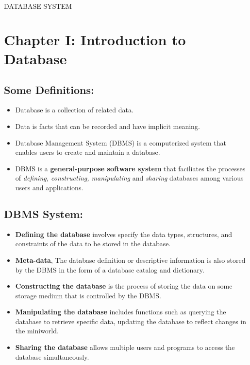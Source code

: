 \documentclass[10pt]{article}
\newcommand{\tf}{\textbf}
\newcommand{\ti}{\textit}
\begin{document}
\begin{center}
	\Huge DATABASE SYSTEM
\end{center}

\renewcommand*\contentsname{Contents:}
\tableofcontents

\newpage

\section{Chapter I: Introduction to Database}

\subsection{Some Definitions: }
\begin{itemize}
	\item Database is a collection of related data.
	\item Data is facts that can be recorded and have implicit meaning.
	\item Database Management System (DBMS) is a computerized system that enables users to create and maintain a database.
	\item DBMS is a \tf{general-purpose software system} that faciliates the processes of \ti{defining, constructing, manipulating} and \ti{sharing} databases among various users and applications.
\end{itemize}
	
\subsection{DBMS System:}
	\begin{itemize}
		\item \tf{Defining the database} involves specify the data types, structures, and constraints of the data to be stored in the database.
		\item \tf{Meta-data}, The database definition or descriptive information is also stored by the DBMS in the form of a database catalog and dictionary.
		\item \tf{Constructing the database} is the process of storing the data on some storage medium that is controlled by the DBMS.
		\item \tf{Manipulating the database} includes functions such as querying the database to retrieve specific data, updating the database to reflect changes in the miniworld.
		\item \tf{Sharing the database} allows multiple users and programs to access the database simultaneously.
	\end{itemize}
\end{document}
